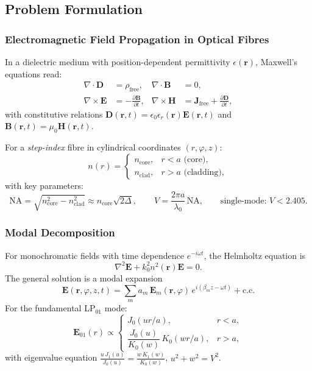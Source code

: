 \documentclass[12pt,a4paper]{article}
\theoremstyle{definition}
\theoremstyle{plain}
\begin{document}
\subsection{Problem Formulation}
\label{sec:week1_problem}

\subsubsection{Electromagnetic Field Propagation in Optical Fibres}

In a dielectric medium with position-dependent permittivity $\epsilon(\mathbf{r})$, Maxwell's
equations read:
\begin{align}
\nabla\cdot\mathbf{D} &= \rho_{\mathrm{free}}, & \nabla\cdot\mathbf{B} &= 0, \label{eq:maxwell12}\\
\nabla\times\mathbf{E} &= -\frac{\partial\mathbf{B}}{\partial t}, &
\nabla\times\mathbf{H} &= \mathbf{J}_{\mathrm{free}}+\frac{\partial\mathbf{D}}{\partial t}, \label{eq:maxwell34}
\end{align}
with constitutive relations $\mathbf{D}(\mathbf{r},t)=\epsilon_0\epsilon_r(\mathbf{r})\mathbf{E}(\mathbf{r},t)$
and $\mathbf{B}(\mathbf{r},t)=\mu_0\mathbf{H}(\mathbf{r},t)$.

For a \emph{step-index} fibre in cylindrical coordinates $(r,\varphi,z)$:
\begin{equation}
n(r) = \begin{cases} n_{\mathrm{core}}, & r < a \text{ (core)},\\ n_{\mathrm{clad}}, & r > a \text{ (cladding)}, \end{cases}
\end{equation}
with key parameters:
\begin{equation}
\mathrm{NA} = \sqrt{n_{\mathrm{core}}^2 - n_{\mathrm{clad}}^2} \approx n_{\mathrm{core}}\sqrt{2\Delta}, \qquad
V = \frac{2\pi a}{\lambda_0}\,\mathrm{NA}, \qquad \text{single-mode: } V < 2.405.
\end{equation}

\subsubsection{Modal Decomposition}

For monochromatic fields with time dependence $e^{-i\omega t}$, the Helmholtz equation is
\begin{equation}
\nabla^2\mathbf{E} + k_0^2 n^2(\mathbf{r})\mathbf{E} = 0.
\end{equation}
The general solution is a modal expansion
\begin{equation}
\mathbf{E}(\mathbf{r},\varphi,z,t) = \sum_m a_m\,\mathbf{E}_m(\mathbf{r},\varphi)\,e^{i(\beta_m z - \omega t)} + \text{c.c.}
\end{equation}
For the fundamental LP$_{01}$ mode:
\begin{equation}
\mathbf{E}_{01}(r) \propto
\begin{cases}
J_0(ur/a), & r < a,\\[2pt]
\dfrac{J_0(u)}{K_0(w)}\,K_0(wr/a), & r > a,
\end{cases}
\end{equation}
with eigenvalue equation $\displaystyle\frac{u\,J_1(u)}{J_0(u)}=\frac{w\,K_1(w)}{K_0(w)}$,\quad
$u^2+w^2=V^2$.
\end{document}
